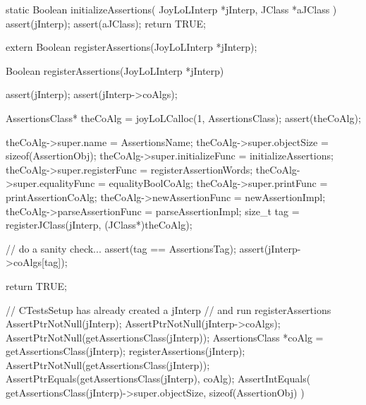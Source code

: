 \stopCHeader

\startCCode
static Boolean initializeAssertions(
  JoyLoLInterp *jInterp,
  JClass   *aJClass
) {
  assert(jInterp);
  assert(aJClass);
  return TRUE;
}
\stopCCode

\startCHeader
extern Boolean registerAssertions(JoyLoLInterp *jInterp);
\stopCHeader
{}

\startCCode
Boolean registerAssertions(JoyLoLInterp *jInterp) {
  assert(jInterp);
  assert(jInterp->coAlgs);
  
  AssertionsClass* theCoAlg
    = joyLoLCalloc(1, AssertionsClass);
  assert(theCoAlg);
  
  theCoAlg->super.name           = AssertionsName;
  theCoAlg->super.objectSize     = sizeof(AssertionObj);
  theCoAlg->super.initializeFunc = initializeAssertions;
  theCoAlg->super.registerFunc   = registerAssertionWords;
  theCoAlg->super.equalityFunc   = equalityBoolCoAlg;
  theCoAlg->super.printFunc      = printAssertionCoAlg;
  theCoAlg->newAssertionFunc     = newAssertionImpl;
  theCoAlg->parseAssertionFunc   = parseAssertionImpl;
  size_t tag =
    registerJClass(jInterp, (JClass*)theCoAlg);
  
  // do a sanity check...
  assert(tag == AssertionsTag);
  assert(jInterp->coAlgs[tag]);
   
  return TRUE;
}
\stopCCode


\startCTest
  // CTestsSetup has already created a jInterp
  // and run registerAssertions
  AssertPtrNotNull(jInterp);
  AssertPtrNotNull(jInterp->coAlgs);
  AssertPtrNotNull(getAssertionsClass(jInterp));
  AssertionsClass *coAlg = getAssertionsClass(jInterp);
  registerAssertions(jInterp);
  AssertPtrNotNull(getAssertionsClass(jInterp));
  AssertPtrEquals(getAssertionsClass(jInterp), coAlg);
  AssertIntEquals(
    getAssertionsClass(jInterp)->super.objectSize,
    sizeof(AssertionObj)
  )
\stopCTest
\stopTestCase
\stopTestSuite
